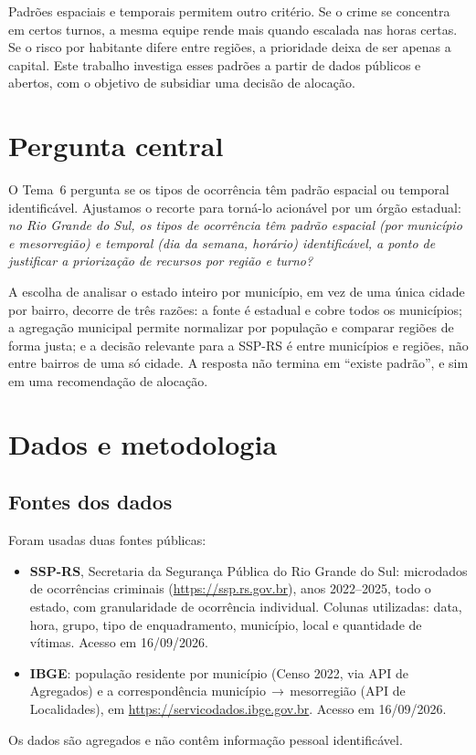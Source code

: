 \documentclass[a4paper,11pt]{article}
\begin{document}
Padrões espaciais e temporais permitem outro critério. Se o crime se concentra
em certos turnos, a mesma equipe rende mais quando escalada nas horas certas. Se
o risco por habitante difere entre regiões, a prioridade deixa de ser apenas a
capital. Este trabalho investiga esses padrões a partir de dados públicos e
abertos, com o objetivo de subsidiar uma decisão de alocação.

\section{Pergunta central}\label{sec:pergunta}
O Tema~6 pergunta se os tipos de ocorrência têm padrão espacial ou temporal
identificável. Ajustamos o recorte para torná-lo acionável por um órgão
estadual: \emph{no Rio Grande do Sul, os tipos de ocorrência têm padrão espacial
(por município e mesorregião) e temporal (dia da semana, horário) identificável,
a ponto de justificar a priorização de recursos por região e turno?}

A escolha de analisar o estado inteiro por município, em vez de uma única
cidade por bairro, decorre de três razões: a fonte é estadual e cobre todos os
municípios; a agregação municipal permite normalizar por população e comparar
regiões de forma justa; e a decisão relevante para a SSP-RS é entre municípios e
regiões, não entre bairros de uma só cidade. A resposta não termina em
``existe padrão'', e sim em uma recomendação de alocação.

\section{Dados e metodologia}\label{sec:metodo}

\subsection{Fontes dos dados}
Foram usadas duas fontes públicas:
\begin{itemize}[nosep]
  \item \textbf{SSP-RS}, Secretaria da Segurança Pública do Rio Grande do Sul:
  microdados de ocorrências criminais (\url{https://ssp.rs.gov.br}), anos
  2022--2025, todo o estado, com granularidade de ocorrência individual. Colunas
  utilizadas: data, hora, grupo, tipo de enquadramento, município, local e
  quantidade de vítimas. Acesso em 16/09/2026.
  \item \textbf{IBGE}: população residente por município (Censo 2022, via API
  de Agregados) e a correspondência município\,$\rightarrow$\,mesorregião (API de
  Localidades), em \url{https://servicodados.ibge.gov.br}. Acesso em 16/09/2026.
\end{itemize}
Os dados são agregados e não contêm informação pessoal identificável.
\end{document}
